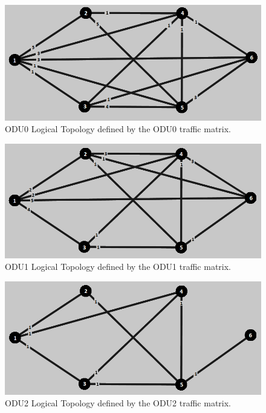 \begin{figure}[H]
\centering
\includegraphics[width=13cm]{sdf/heuristic/transparent_protection/low/logical_topology_odu0_low}
\caption{ODU0 Logical Topology defined by the ODU0 traffic matrix.}
\label{logical_ODU0_protection_ref_low_heuristic_transparent}
\end{figure}

\begin{figure}[H]
\centering
\includegraphics[width=13cm]{sdf/heuristic/transparent_protection/low/logical_topology_odu1_low}
\caption{ODU1 Logical Topology defined by the ODU1 traffic matrix.}
\label{logical_ODU1_protection_ref_low_heuristic_transparent}
\end{figure}

\begin{figure}[H]
\centering
\includegraphics[width=13cm]{sdf/heuristic/transparent_protection/low/logical_topology_odu2_low}
\caption{ODU2 Logical Topology defined by the ODU2 traffic matrix.}
\label{logical_ODU2_protection_ref_low_heuristic_transparent}
\end{figure}

